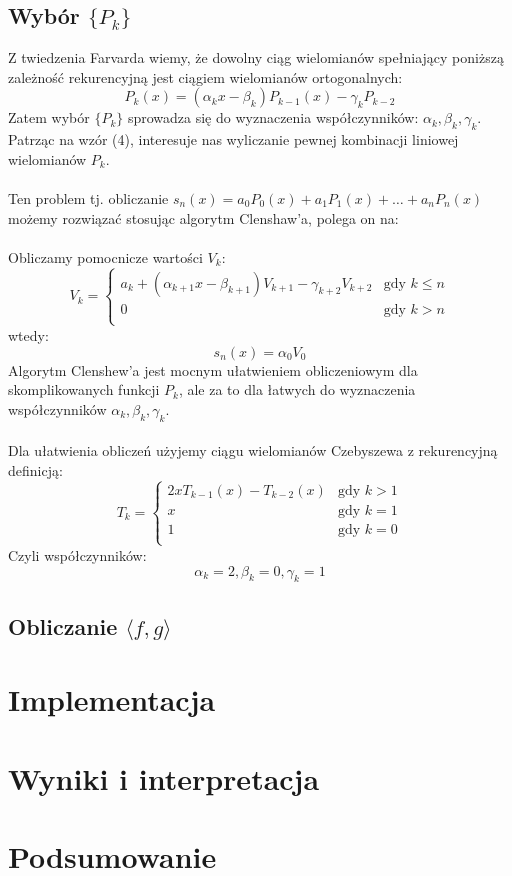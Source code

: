 \documentclass{article}
\begin{document}
\subsection*{Wybór $\{P_k\}$}
Z twiedzenia Farvarda wiemy, że dowolny ciąg wielomianów spełniający poniższą zależność rekurencyjną jest ciągiem wielomianów ortogonalnych:
\begin{equation}
P_k(x) = (\alpha_kx - \beta_k)P_{k-1}(x) - \gamma_kP_{k-2}
\end{equation}
Zatem wybór $\{P_k\}$ sprowadza się do wyznaczenia współczynników: $\alpha_k,\beta_k, \gamma_k$.\\
Patrząc na wzór (4), interesuje nas wyliczanie pewnej kombinacji liniowej wielomianów $P_k$.\\\\Ten problem tj. obliczanie $s_n(x) = a_0P_0(x) + a_1P_1(x) + \ldots + a_nP_n(x)$ możemy rozwiązać stosując algorytm Clenshaw'a, polega on na:\\\\
Obliczamy pomocnicze wartości $V_k$:
\begin{equation}
V_k = 
\begin{cases}
a_k + (\alpha_{k+1}x - \beta_{k+1})V_{k+1} - \gamma_{k+2}V_{k+2} & \text{gdy } k \leq  n\\
0 & \text{gdy } k > n\\
\end{cases}
\end{equation}
wtedy:
\begin{equation}
s_n(x) = \alpha_0V_0
\end{equation}
Algorytm Clenshew'a jest mocnym ułatwieniem obliczeniowym dla skomplikowanych funkcji $P_k$, ale za to dla łatwych do wyznaczenia \\ współczynników $\alpha_k,\beta_k, \gamma_k$.\\\\
Dla ułatwienia obliczeń użyjemy ciągu wielomianów Czebyszewa z rekurencyjną definicją:
\begin{equation}
T_k = 
\begin{cases}
2xT_{k-1}(x) - T_{k-2}(x) & \text{gdy } k >  1\\
x & \text{gdy } k =  1\\
1 & \text{gdy } k = 0\\
\end{cases}
\end{equation}
Czyli współczynników:
\begin{equation}
\alpha_k = 2, \beta_k = 0, \gamma_k = 1
\end{equation}

\subsection*{Obliczanie $\langle f, g\rangle$}

\section{Implementacja}
\section{Wyniki i interpretacja}
\section{Podsumowanie}

\end{document}
